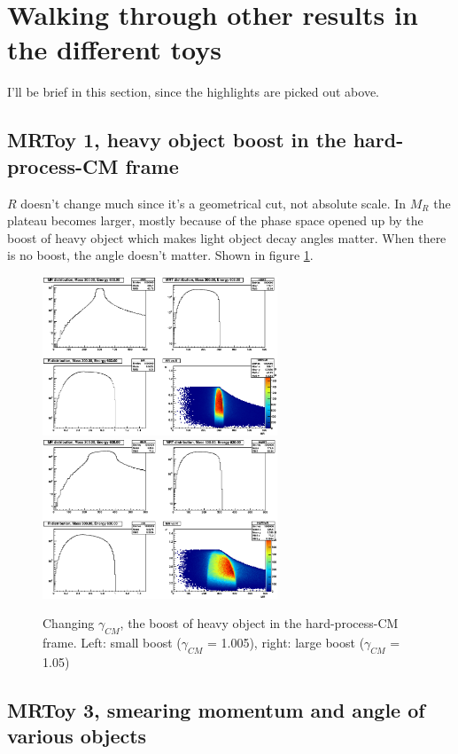 \documentclass{fheadnote}
\begin{document}
\section{Walking through other results in the different toys}

I'll be brief in this section, since the highlights are picked out above.

\subsection{MRToy 1, heavy object boost in the hard-process-CM frame}

$R$ doesn't change much since it's a geometrical cut, not absolute scale.
In $M_R$ the plateau becomes larger, mostly because of the phase space opened up by the boost of heavy object which makes light object decay angles matter.
When there is no boost, the angle doesn't matter.  Shown in figure \ref{Figure_MRToy1}.

\begin{figure}[htbp]
   \centering
   \includegraphics[width=7cm]{Figures/MRToy1_SmallGammaCM}
   \includegraphics[width=7cm]{Figures/MRToy1_LargerGammaCM}
   \caption{Changing $\gamma_{CM}$, the boost of heavy object in the hard-process-CM frame.  Left: small boost ($\gamma_{CM}$ = 1.005), right: large boost ($\gamma_{CM}$ = 1.05)}
   \label{Figure_MRToy1}
\end{figure}

\subsection{MRToy 3, smearing momentum and angle of various objects}
\end{document}
